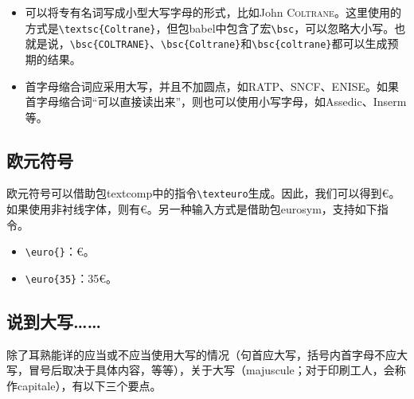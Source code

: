 \begin{itemize}
\begin{codelist}[7.4]{
12\,345\,678,234\,34
}
\begin{verbatim}
\nombre{12345678,23434}
\end{verbatim}
\end{codelist}

    \item 可以将专有名词写成小型大写字母的形式，比如John \textsc{Coltrane}。这里使用的方式是\linebreak\verb|\textsc{Coltrane}|，但包\textsf{babel}中包含了宏\verb|\bsc|，可以忽略大小写。也就是说，\verb|\bsc{COLTRANE}|、\linebreak\verb|\bsc{Coltrane}|和\verb|\bsc{coltrane}|都可以生成预期的结果。
    
    \item 首字母缩合词应采用大写，并且不加圆点，如RATP、SNCF、ENISE。如果首字母缩合词``可以直接读出来''，则也可以使用小写字母，如Assedic、Inserm等。
\end{itemize}

\subsection{欧元符号}

欧元符号可以借助包\textsf{textcomp}中的指令\verb|\texteuro|生成。因此，我们可以得到€。如果使用非衬线字体，则有\textsf{€}。另一种输入方式是借助包\textsf{eurosym}，支持如下指令。

\begin{itemize}
    \item \verb|\euro{}|：€。
    \item \verb|\euro{35}|：35€。
\end{itemize}

\subsection{说到大写……}

除了耳熟能详的应当或不应当使用大写的情况（句首应大写，括号内首字母不应大写，冒号后取决于具体内容，等等），关于大写（majuscule；对于印刷工人，会称作capitale），有以下三个要点。

